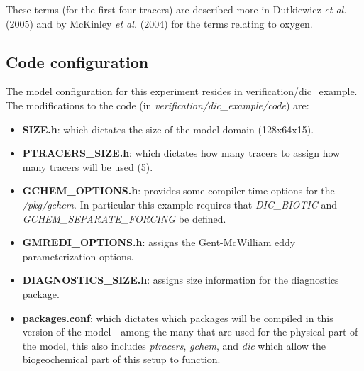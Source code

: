 These terms (for the first four tracers) are described more in
Dutkiewicz {\it et al.} (2005) and by McKinley {\it et al.} (2004) for
the terms relating to oxygen.


\subsection{Code configuration}

The model configuration for this experiment resides in
verification/dic\_example. The modifications to the code (in {\it
  verification/dic\_example/code}) are:
\begin{itemize}
\item{{\bf SIZE.h}: which dictates the size of the model domain
    (128x64x15).}
\item{\bf PTRACERS\_SIZE.h}: which dictates how many tracers to assign
  how many tracers will be used (5).
\item{\bf GCHEM\_OPTIONS.h}: provides some compiler time options for
  the {\it /pkg/gchem}. In particular this example requires that {\it
    DIC\_BIOTIC} and {\it GCHEM\_SEPARATE\_FORCING} be defined.
\item{\bf GMREDI\_OPTIONS.h}: assigns the Gent-McWilliam eddy
  parameterization options.
\item{\bf DIAGNOSTICS\_SIZE.h}: assigns size information for the
  diagnostics package.
\item{\bf packages.conf}: which dictates which packages will be
  compiled in this version of the model - among the many that are used
  for the physical part of the model, this also includes {\it
    ptracers}, {\it gchem}, and {\it dic} which allow the
  biogeochemical part of this setup to function.
\end{itemize}


